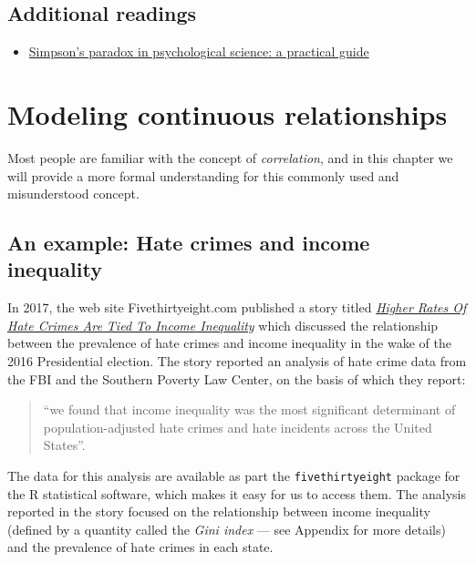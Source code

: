 \documentclass[12pt,]{book}
\providecommand{\tightlist}{%
  \setlength{\itemsep}{0pt}\setlength{\parskip}{0pt}}
\theoremstyle{definition}
\theoremstyle{definition}
\theoremstyle{definition}
\theoremstyle{remark}
\begin{document}
\hypertarget{additional-readings}{%
\section{Additional readings}\label{additional-readings}}

\begin{itemize}
\tightlist
\item
  \href{https://www.frontiersin.org/articles/10.3389/fpsyg.2013.00513/full}{Simpson's paradox in psychological science: a practical guide}
\end{itemize}

\hypertarget{modeling-continuous-relationships}{%
\chapter{Modeling continuous relationships}\label{modeling-continuous-relationships}}

Most people are familiar with the concept of \emph{correlation}, and in this chapter we will provide a more formal understanding for this commonly used and misunderstood concept.

\hypertarget{an-example-hate-crimes-and-income-inequality}{%
\section{An example: Hate crimes and income inequality}\label{an-example-hate-crimes-and-income-inequality}}

In 2017, the web site Fivethirtyeight.com published a story titled \href{https://fivethirtyeight.com/features/higher-rates-of-hate-crimes-are-tied-to-income-inequality/}{\emph{Higher Rates Of Hate Crimes Are Tied To Income Inequality}} which discussed the relationship between the prevalence of hate crimes and income inequality in the wake of the 2016 Presidential election. The story reported an analysis of hate crime data from the FBI and the Southern Poverty Law Center, on the basis of which they report:

\begin{quote}
``we found that income inequality was the most significant determinant of population-adjusted hate crimes and hate incidents across the United States''.
\end{quote}

The data for this analysis are available as part the \texttt{fivethirtyeight} package for the R statistical software, which makes it easy for us to access them. The analysis reported in the story focused on the relationship between income inequality (defined by a quantity called the \emph{Gini index} --- see Appendix for more details) and the prevalence of hate crimes in each state.
\end{document}
